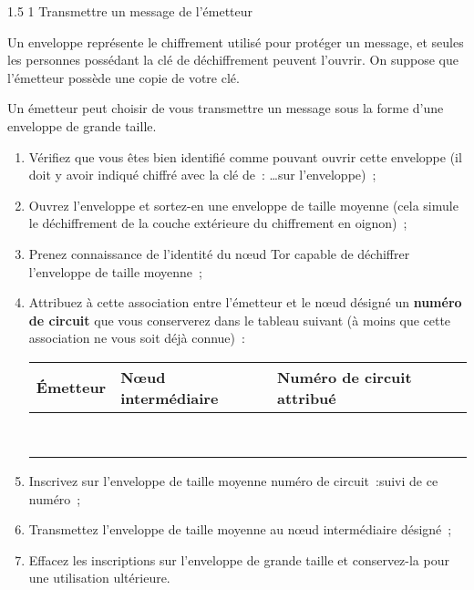 \documentclass[a4paper,twoside,french]{article}
\makeatletter
\renewcommand\section{\@startsection
  {section}{1}{1cm}%
  {1.5\baselineskip}%
  {1\baselineskip}%
  {\normalfont\Large\bfseries}}%
\makeatother
\begin{document}
  \section{Transmettre un message de l'émetteur}

  Un enveloppe représente le chiffrement utilisé pour protéger un
  message, et seules les personnes possédant la clé de déchiffrement
  peuvent l'ouvrir. On suppose que l'émetteur possède une copie de
  votre clé.

  Un émetteur peut choisir de vous transmettre un message sous la
  forme d'une enveloppe de grande taille.

  \begin{enumerate}
  \item Vérifiez que vous êtes bien identifié comme pouvant ouvrir
    cette enveloppe (il doit y avoir indiqué \og chiffré avec la clé
    de~: \ldots\fg sur l'enveloppe)~;
  \item Ouvrez l'enveloppe et sortez-en une enveloppe de taille
    moyenne (cela simule le déchiffrement de la couche extérieure du
    chiffrement en oignon)~;
  \item Prenez connaissance de l'identité du n\oe ud Tor capable de
    déchiffrer l'enveloppe de taille moyenne~;
  \item Attribuez à cette association entre l'émetteur et le n\oe ud
    désigné un \textbf{numéro de circuit} que vous conserverez dans le
    tableau suivant (à moins que cette association ne vous soit déjà
    connue)~:
    \begin{center}
      \begin{tabular}{|m{3cm}|m{3cm}|m{4cm}|}
        \hline
        Émetteur & N\oe ud intermédiaire &  Numéro de circuit attribué \\
        \hline
        & & \\
        & & \\
        \hline
        & & \\
        & & \\
        \hline
        & & \\
        & & \\
        \hline
        & & \\
        & & \\
        \hline
      \end{tabular}
    \end{center}
  \item Inscrivez sur l'enveloppe de taille moyenne \og numéro de
    circuit~:\fg suivi de ce numéro~;
  \item Transmettez l'enveloppe de taille moyenne au n\oe ud
    intermédiaire désigné~;
  \item Effacez les inscriptions sur l'enveloppe de grande taille et
    conservez-la pour une utilisation ultérieure.
  \end{enumerate}
\end{document}
